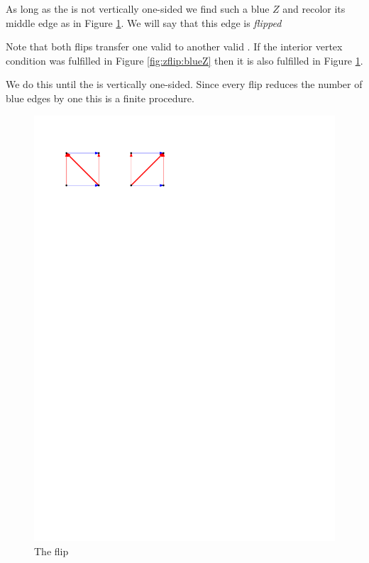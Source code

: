   As long as the \rel is not vertically one-sided we find such a blue $Z$ and recolor its middle edge as in Figure \ref{fig:zflip:flip}. We will say that this edge is \emph{flipped}

  Note that both flips transfer one valid \rel to another valid \rel. If the interior vertex condition was fulfilled in Figure \ref{fig:zflip:blueZ} then it is also fulfilled in Figure \ref{fig:zflip:flip}.

   We do this until the \rel is vertically one-sided. Since every flip reduces the number of blue edges by one this is a finite procedure.

  \begin{figure}[h]
    \centering
    \includegraphics[scale=1]{unifiedAlgo/img/zflip/flip.pdf}
    \caption{The flip}
    \label{fig:zflip:flip}
  \end{figure}

